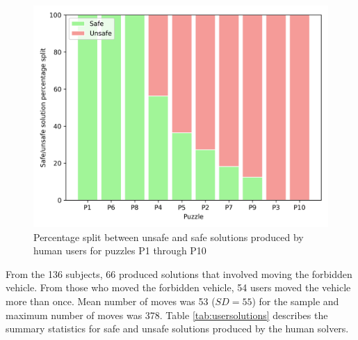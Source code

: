 \begin{figure}[htb]
  \centering
\includegraphics[width=0.5\columnwidth]{img/p2.png}
  \caption{Percentage split between unsafe and safe solutions produced by human users for puzzles P1 through P10}
  \label{fig:split}
\end{figure}


From the 136 subjects, 66 produced solutions that involved moving the forbidden vehicle. From those who moved the forbidden vehicle, 54 users moved the vehicle more than once. Mean number of moves was 53 ($SD=55$) for the sample and maximum number of moves was 378. Table \ref{tab:usersolutions} describes the summary statistics for safe and unsafe solutions produced by the human solvers. 

